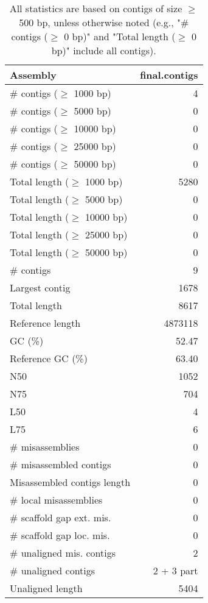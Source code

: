 \documentclass[12pt,a4paper]{article}
\begin{document}
\begin{table}[ht]
\begin{center}
\caption{All statistics are based on contigs of size $\geq$ 500 bp, unless otherwise noted (e.g., "\# contigs ($\geq$ 0 bp)" and "Total length ($\geq$ 0 bp)" include all contigs).}
\begin{tabular}{|l*{1}{|r}|}
\hline
Assembly & final.contigs \\ \hline
\# contigs ($\geq$ 1000 bp) & 4 \\ \hline
\# contigs ($\geq$ 5000 bp) & 0 \\ \hline
\# contigs ($\geq$ 10000 bp) & 0 \\ \hline
\# contigs ($\geq$ 25000 bp) & 0 \\ \hline
\# contigs ($\geq$ 50000 bp) & 0 \\ \hline
Total length ($\geq$ 1000 bp) & 5280 \\ \hline
Total length ($\geq$ 5000 bp) & 0 \\ \hline
Total length ($\geq$ 10000 bp) & 0 \\ \hline
Total length ($\geq$ 25000 bp) & 0 \\ \hline
Total length ($\geq$ 50000 bp) & 0 \\ \hline
\# contigs & 9 \\ \hline
Largest contig & 1678 \\ \hline
Total length & 8617 \\ \hline
Reference length & 4873118 \\ \hline
GC (\%) & 52.47 \\ \hline
Reference GC (\%) & 63.40 \\ \hline
N50 & 1052 \\ \hline
N75 & 704 \\ \hline
L50 & 4 \\ \hline
L75 & 6 \\ \hline
\# misassemblies & 0 \\ \hline
\# misassembled contigs & 0 \\ \hline
Misassembled contigs length & 0 \\ \hline
\# local misassemblies & 0 \\ \hline
\# scaffold gap ext. mis. & 0 \\ \hline
\# scaffold gap loc. mis. & 0 \\ \hline
\# unaligned mis. contigs & 2 \\ \hline
\# unaligned contigs & 2 + 3 part \\ \hline
Unaligned length & 5404 \\ \hline

\end{tabular}
\end{center}
\end{table}
\end{document}
